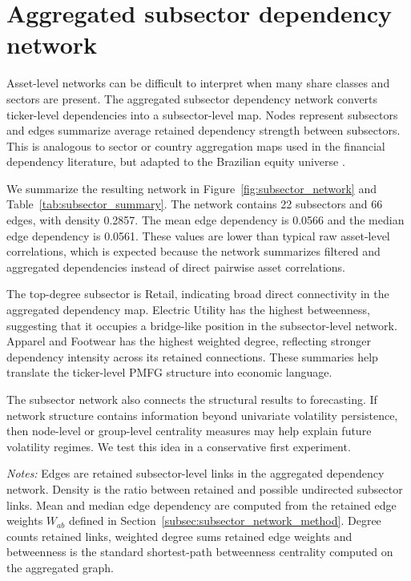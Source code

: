 \section{Aggregated subsector dependency network}
\label{sec:subsector_network}

Asset-level networks can be difficult to interpret when many share classes and sectors are present. The aggregated subsector dependency network converts ticker-level dependencies into a subsector-level map. Nodes represent subsectors and edges summarize average retained dependency strength between subsectors. This is analogous to sector or country aggregation maps used in the financial dependency literature, but adapted to the Brazilian equity universe \cite{raddant_dimatteo_2023}.

We summarize the resulting network in Figure~\ref{fig:subsector_network} and Table~\ref{tab:subsector_summary}. The network contains 22 subsectors and 66 edges, with density 0.2857. The mean edge dependency is 0.0566 and the median edge dependency is 0.0561. These values are lower than typical raw asset-level correlations, which is expected because the network summarizes filtered and aggregated dependencies instead of direct pairwise asset correlations.

The top-degree subsector is Retail, indicating broad direct connectivity in the aggregated dependency map. Electric Utility has the highest betweenness, suggesting that it occupies a bridge-like position in the subsector-level network. Apparel and Footwear has the highest weighted degree, reflecting stronger dependency intensity across its retained connections. These summaries help translate the ticker-level PMFG structure into economic language.

The subsector network also connects the structural results to forecasting. If network structure contains information beyond univariate volatility persistence, then node-level or group-level centrality measures may help explain future volatility regimes. We test this idea in a conservative first experiment.


\begin{center}
\label{tab:subsector_summary}
\end{center}
\noindent\footnotesize\emph{Notes:} Edges are retained subsector-level links in the aggregated dependency network. Density is the ratio between retained and possible undirected subsector links. Mean and median edge dependency are computed from the retained edge weights $W_{ab}$ defined in Section~\ref{subsec:subsector_network_method}. Degree counts retained links, weighted degree sums retained edge weights and betweenness is the standard shortest-path betweenness centrality computed on the aggregated graph.

